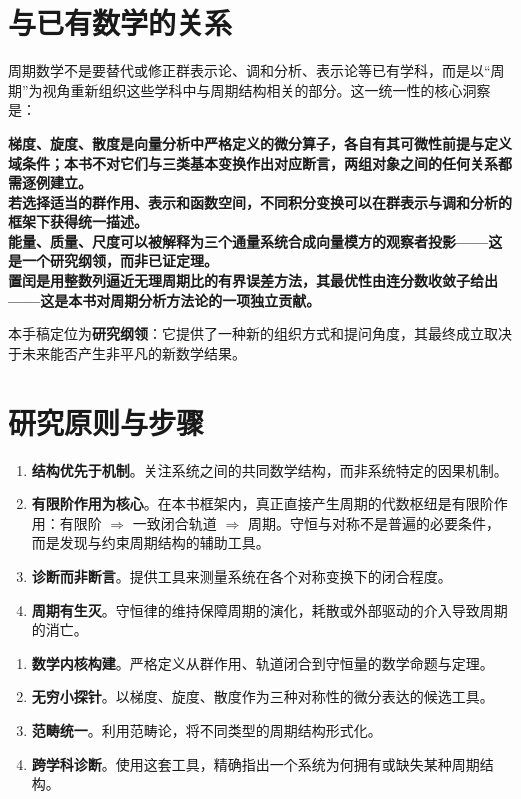 \section*{与已有数学的关系}

周期数学不是要替代或修正群表示论、调和分析、表示论等已有学科，而是以“周期”为视角重新组织这些学科中与周期结构相关的部分。这一统一性的核心洞察是：
\begin{center}
\textbf{梯度、旋度、散度是向量分析中严格定义的微分算子，各自有其可微性前提与定义域条件；本书不对它们与三类基本变换作出对应断言，两组对象之间的任何关系都需逐例建立。}\\
\textbf{若选择适当的群作用、表示和函数空间，不同积分变换可以在群表示与调和分析的框架下获得统一描述。}\\
\textbf{能量、质量、尺度可以被解释为三个通量系统合成向量模方的观察者投影——这是一个研究纲领，而非已证定理。}\\
\textbf{置闰是用整数列逼近无理周期比的有界误差方法，其最优性由连分数收敛子给出——这是本书对周期分析方法论的一项独立贡献。}
\end{center}

本手稿定位为\textbf{研究纲领}：它提供了一种新的组织方式和提问角度，其最终成立取决于未来能否产生非平凡的新数学结果。

\section*{研究原则与步骤}

\begin{enumerate}[leftmargin=5em, label={\textbf{原则 \arabic*}}]
    \item \textbf{结构优先于机制}。关注系统之间的共同数学结构，而非系统特定的因果机制。
    \item \textbf{有限阶作用为核心}。在本书框架内，真正直接产生周期的代数枢纽是有限阶作用：有限阶 $\Rightarrow$ 一致闭合轨道 $\Rightarrow$ 周期。守恒与对称不是普遍的必要条件，而是发现与约束周期结构的辅助工具。
    \item \textbf{诊断而非断言}。提供工具来测量系统在各个对称变换下的闭合程度。
    \item \textbf{周期有生灭}。守恒律的维持保障周期的演化，耗散或外部驱动的介入导致周期的消亡。
\end{enumerate}

\begin{enumerate}[leftmargin=5em, label={\textbf{步骤 \arabic*}}]
    \item \textbf{数学内核构建}。严格定义从群作用、轨道闭合到守恒量的数学命题与定理。
    \item \textbf{无穷小探针}。以梯度、旋度、散度作为三种对称性的微分表达的候选工具。
    \item \textbf{范畴统一}。利用范畴论，将不同类型的周期结构形式化。
    \item \textbf{跨学科诊断}。使用这套工具，精确指出一个系统为何拥有或缺失某种周期结构。
\end{enumerate}

